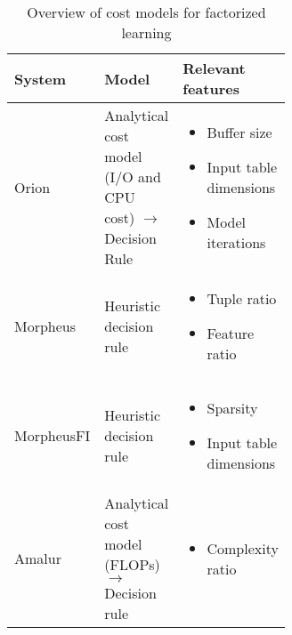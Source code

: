 \begin{table}[ht]
  \centering
  \begin{tabular}{lp{0.30\linewidth}p{0.32\linewidth}}
    \toprule
    System                                          & Model                                                                & Relevant features                                                                                                                           \\ \midrule \midrule
    Orion      \cite{orion_learning_gen_lin_models} & Analytical cost model (I/O and CPU cost) $\rightarrow$ Decision Rule & \begin{itemize}[noitemsep,topsep=0pt,leftmargin=0.3cm] \item Buffer size \item Input table dimensions \item Model iterations  \end{itemize} \\ \midrule
    Morpheus    \cite{morpheus}                     & Heuristic decision rule                                              & \begin{itemize}[noitemsep,topsep=0pt,leftmargin=0.3cm] \item Tuple ratio \item Feature ratio  \end{itemize}                                 \\\midrule
    MorpheusFI  \cite{MorpheusFI}                   & Heuristic decision rule                                              & \begin{itemize}[noitemsep,topsep=0pt,leftmargin=0.3cm] \item Sparsity \item Input table dimensions \end{itemize}                            \\\midrule
    Amalur     \cite{amalur_tkde24}                 & Analytical cost model (FLOPs) $\rightarrow$ Decision rule            & \begin{itemize}[noitemsep,topsep=0pt,leftmargin=00.3cm] \item Complexity ratio \end{itemize}                                                \\
    \bottomrule
  \end{tabular}
  \caption{Overview of cost models for factorized learning}
  \label{tab:cost_model_overview}
\end{table}

